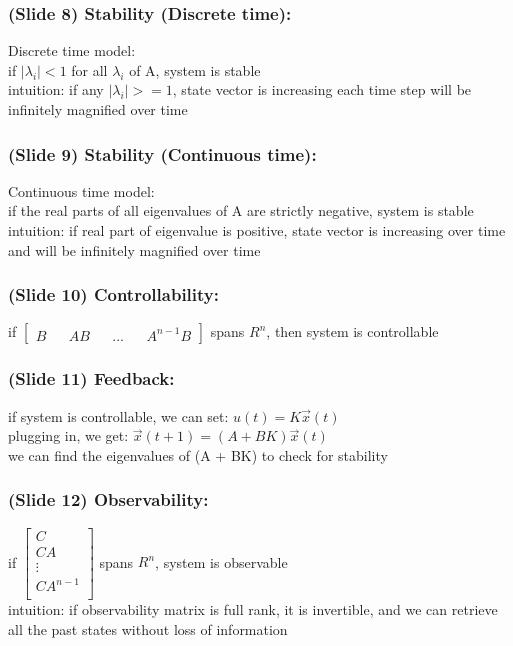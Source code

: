 \documentclass{beamer}
\begin{document}
\begin{frame}
\frametitle{(Slide 8) Stability (Discrete time):}

Discrete time model: \\
if $|\lambda_{i}| < 1$ for all $\lambda_{i}$ of A, system is stable\\
intuition: if any $|\lambda_{i}| >= 1$, state vector is increasing each time step will be infinitely magnified over time \\
\end{frame}

\begin{frame}
\frametitle{(Slide 9) Stability (Continuous time):}

Continuous time model: \\
if the real parts of all eigenvalues of A are strictly negative, system is stable\\
intuition: if real part of eigenvalue is positive, state vector is increasing over time and will be infinitely magnified over time \\
\end{frame}

\begin{frame}
\frametitle{(Slide 10) Controllability:}

if
$\begin{bmatrix}
B && AB && ... && A^{n-1}B
\end{bmatrix}$
spans $R^{n}$, then system is controllable 
\end{frame}

\begin{frame}
\frametitle{(Slide 11) Feedback:}

if system is controllable, we can set: 
$u(t) = K\vec{x}(t)$ \\
plugging in, we get: 
$\vec{x}(t+1) = (A + BK)\vec{x}(t)$ \\
we can find the eigenvalues of (A + BK) to check for stability
\end{frame}

\begin{frame}
\frametitle{(Slide 12) Observability:} 

if 
$\begin{bmatrix}
C \\
CA \\
\vdots \\
CA^{n-1} \\
\end{bmatrix}$
spans $R^{n}$, system is observable \\
intuition: if observability matrix is full rank, it is invertible, and we can retrieve all the past states without loss of information \\
\end{frame}
\end{document}
